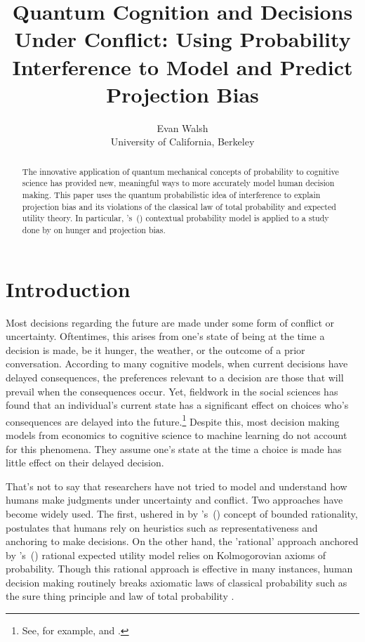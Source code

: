 \documentclass[12pt]{article}
\newcommand\citepos[1]{\citeauthor*{#1}'s\ (\citeyear{#1})}
\begin{document}
	\title{Quantum Cognition and Decisions Under Conflict: Using Probability Interference to Model and Predict Projection Bias}
	\author{Evan Walsh \\ University of California, Berkeley}
	
	
	\maketitle
	
\begin{abstract}
	The innovative application of quantum mechanical concepts of probability to cognitive science has provided new, meaningful ways to more accurately model human decision making. This paper uses the quantum probabilistic idea of interference to explain projection bias and its violations of the classical law of total probability and expected utility theory. In particular, \citepos{khrennikov_haven_2009} contextual probability model is applied to a study done by \cite{read_leeuwen_1998} on hunger and projection bias. 
\end{abstract}
	
	\section{Introduction}
	Most decisions regarding the future are made under some form of conflict or uncertainty. Oftentimes, this arises from one's state of being at the time a decision is made, be it hunger, the weather, or the outcome of a prior conversation. According to many cognitive models, when current decisions have delayed consequences, the preferences relevant to a decision are those that will prevail when the consequences occur. Yet, fieldwork in the social sciences has found that an individual's current state has a significant effect on choices who's consequences are delayed into the future.\footnote{See, for example, \cite{badger_bickel_giordano_jacobs_loewenstein_marsch_2004} and \cite{conlin_odonoghue_vogelsang_2007}.} Despite this, most decision making models from economics to cognitive science to machine learning do not account for this phenomena. They assume one's state at the time a choice is made has little effect on their delayed decision. 
	
	That's not to say that researchers have not tried to model and understand how humans make judgments under uncertainty and conflict. Two approaches have become widely used. The first, ushered in by \citepos{rogow_simon_komarovsky_1957} concept of bounded rationality, postulates that humans rely on heuristics such as representativeness and anchoring to make decisions. On the other hand, the 'rational' approach anchored by \citepos{samuelson_1937} rational expected utility model relies on Kolmogorovian axioms of probability. Though this rational approach is effective in many instances, human decision making routinely breaks axiomatic laws of classical probability such as the sure thing principle and law of total probability \citep{tversky_shafir_1992}.
	
\end{document}
